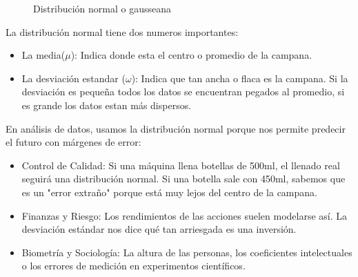 \begin{figure}[!ht]
    \centering
\caption{Distribución normal o gausseana}
\label{distribución_gausseana_numpy}
\end{figure}

La distribución normal tiene dos numeros importantes:
\begin{itemize}
    \item La media(\(\mu\)): Indica donde esta el centro o promedio de la campana.
    \item La desviación estandar (\(\omega\)): Indica que tan ancha o flaca es la campana. Si la desviación es pequeña todos los datos se encuentran pegados al promedio, si es grande los datos estan más dispersos.
\end{itemize}

En análisis de datos, usamos la distribución normal porque nos permite predecir el futuro con márgenes de error:
\begin{itemize}
    \item Control de Calidad: Si una máquina llena botellas de 500ml, el llenado real seguirá una distribución normal. Si una botella sale con 450ml, sabemos que es un "error extraño" porque está muy lejos del centro de la campana.
    \item Finanzas y Riesgo: Los rendimientos de las acciones suelen modelarse así. La desviación estándar nos dice qué tan arriesgada es una inversión.
    \item Biometría y Sociología: La altura de las personas, los coeficientes intelectuales o los errores de medición en experimentos científicos.
\end{itemize}

